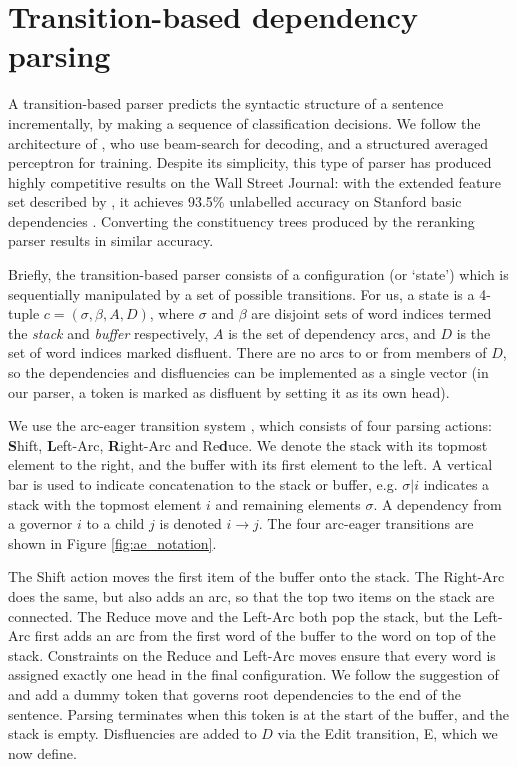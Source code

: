 \documentclass[11pt,letterpaper]{article}
\begin{document}
\section{Transition-based dependency parsing}

A transition-based parser predicts the syntactic structure of a sentence incrementally,
by making a sequence of classification decisions.  We follow the architecture of
\citet{zhang:cl11}, who use beam-search for decoding, and a structured averaged
perceptron for training.  Despite its simplicity, this type of parser
has produced highly competitive results on the Wall Street Journal: with the
extended feature set described by \citet{zhang:11}, it achieves 93.5\%
unlabelled accuracy on Stanford basic dependencies \citep{stanford_deps}.  Converting
the constituency trees produced by the \citet{Charniak05a} reranking parser
results in similar accuracy.

Briefly, the transition-based parser consists of a configuration (or `state') which
is sequentially manipulated by a set of possible transitions. For us, a state is a 4-tuple
$c = (\sigma, \beta, A, D)$, where $\sigma$ and $\beta$ are disjoint sets of word
indices termed the \emph{stack} and \emph{buffer} respectively, $A$ is the set of
dependency arcs, and $D$ is the set of word indices marked disfluent.  There are no
arcs to or from members of $D$, so the dependencies and disfluencies can be
implemented as a single vector (in our parser, a token is marked as disfluent
by setting it as its own head).

We use the arc-eager transition system \citep{nivre:03,nivre:cl}, which consists
of four parsing actions:  \textbf{S}hift, \textbf{L}eft-Arc,
\textbf{R}ight-Arc and Re\textbf{d}uce.
We denote the stack with its topmost element
to the right, and the buffer with its first element to the left. A vertical bar
is used to indicate concatenation to the stack or buffer, e.g. $\sigma | i$ indicates
a stack with the topmost element $i$ and remaining elements $\sigma$.  
A dependency from a governor $i$ to a child $j$ is denoted $i \rightarrow j$.
The four arc-eager transitions are shown in Figure \ref{fig:ae_notation}.

The Shift action moves the first item of the buffer onto the stack.
The Right-Arc does the same, but also adds an arc, so that the top two items
on the stack are connected. The Reduce move and the Left-Arc both pop the stack,
but the Left-Arc first adds an arc from the first word of the buffer to the word
on top of the stack. Constraints on the Reduce and Left-Arc
moves ensure that every word is assigned exactly one head in the final configuration.
We follow the suggestion of \citet{nivre:squib} and
add a dummy token that governs root dependencies to the end of the sentence.
Parsing terminates when this token is at the start of the buffer, and the stack is empty.
Disfluencies are added to $D$ via the Edit transition, E, which we now define.
\end{document}
